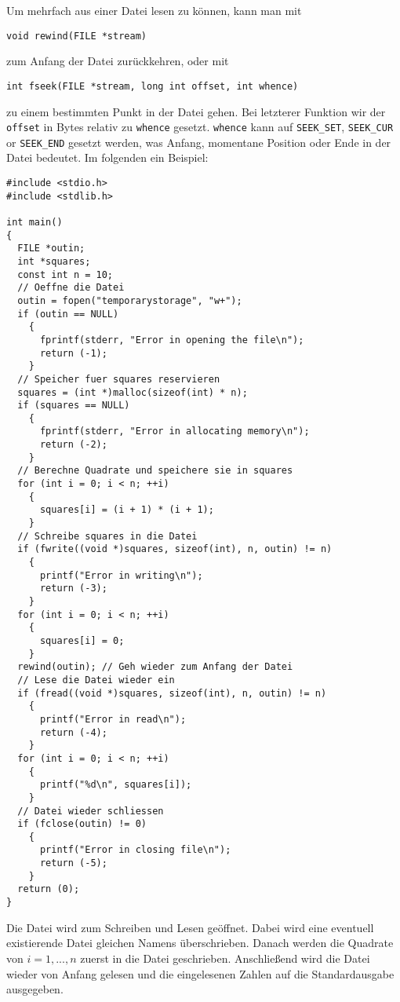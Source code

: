 Um mehrfach aus einer Datei lesen zu können, kann man mit
\begin{lstlisting}
void rewind(FILE *stream)
\end{lstlisting}
zum Anfang der Datei zurückkehren, oder mit
\begin{lstlisting}
int fseek(FILE *stream, long int offset, int whence)
\end{lstlisting}
zu einem bestimmten Punkt in der Datei gehen.
Bei letzterer Funktion wir der \verb|offset| in Bytes relativ zu \verb|whence| gesetzt.
\verb|whence| kann auf \verb|SEEK_SET|, \verb|SEEK_CUR| or \verb|SEEK_END| gesetzt werden, was Anfang, momentane Position oder Ende in der Datei bedeutet.
Im folgenden ein Beispiel:
\begin{lstlisting}
#include <stdio.h>
#include <stdlib.h>

int main()
{
  FILE *outin;
  int *squares;
  const int n = 10;
  // Oeffne die Datei
  outin = fopen("temporarystorage", "w+");
  if (outin == NULL)
    {
      fprintf(stderr, "Error in opening the file\n");
      return (-1);
    }
  // Speicher fuer squares reservieren
  squares = (int *)malloc(sizeof(int) * n);
  if (squares == NULL)
    {
      fprintf(stderr, "Error in allocating memory\n");
      return (-2);
    }
  // Berechne Quadrate und speichere sie in squares
  for (int i = 0; i < n; ++i)
    {
      squares[i] = (i + 1) * (i + 1);
    }
  // Schreibe squares in die Datei
  if (fwrite((void *)squares, sizeof(int), n, outin) != n)
    {
      printf("Error in writing\n");
      return (-3);
    }
  for (int i = 0; i < n; ++i)
    {
      squares[i] = 0;
    }
  rewind(outin); // Geh wieder zum Anfang der Datei
  // Lese die Datei wieder ein
  if (fread((void *)squares, sizeof(int), n, outin) != n)
    {
      printf("Error in read\n");
      return (-4);
    }
  for (int i = 0; i < n; ++i)
    {
      printf("%d\n", squares[i]);
    }
  // Datei wieder schliessen
  if (fclose(outin) != 0)
    {
      printf("Error in closing file\n");
      return (-5);
    }
  return (0);
}
\end{lstlisting}
Die Datei wird zum Schreiben und Lesen geöffnet.
Dabei wird eine eventuell existierende Datei gleichen Namens überschrieben.
Danach werden die Quadrate von $i=1,...,n$ zuerst in die Datei geschrieben.
Anschließend wird die Datei wieder von Anfang gelesen und die eingelesenen Zahlen auf die Standardausgabe ausgegeben.
